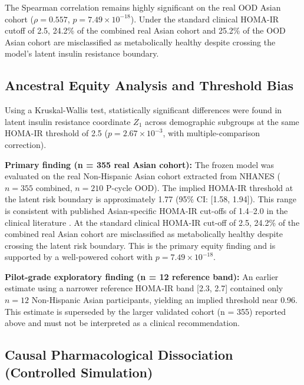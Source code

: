 \documentclass[12pt,a4paper,oneside]{report}
\begin{document}
The Spearman correlation remains highly significant on the real OOD Asian cohort ($\rho = 0.557$, $p = 7.49 \times 10^{-18}$). Under the standard clinical HOMA-IR cutoff of 2.5, 24.2\% of the combined real Asian cohort and 25.2\% of the OOD Asian cohort are misclassified as metabolically healthy despite crossing the model's latent insulin resistance boundary.

\subsection{Ancestral Equity Analysis and Threshold Bias}

Using a Kruskal-Wallis test, statistically significant differences were found in latent insulin resistance coordinate $Z_1$ across demographic subgroups at the same HOMA-IR threshold of 2.5 ($p = 2.67 \times 10^{-3}$, with multiple-comparison correction).

\textbf{Primary finding (n = 355 real Asian cohort):} The frozen model was evaluated on the real Non-Hispanic Asian cohort extracted from NHANES ($n = 355$ combined, $n = 210$ P-cycle OOD). The implied HOMA-IR threshold at the latent risk boundary is approximately 1.77 (95\% CI: [1.58, 1.94]). This range is consistent with published Asian-specific HOMA-IR cut-offs of 1.4--2.0 in the clinical literature \citep{cdc2020}. At the standard clinical HOMA-IR cut-off of 2.5, 24.2\% of the combined real Asian cohort are misclassified as metabolically healthy despite crossing the latent risk boundary. This is the primary equity finding and is supported by a well-powered cohort with $p = 7.49 \times 10^{-18}$.

\textbf{Pilot-grade exploratory finding (n = 12 reference band):} An earlier estimate using a narrower reference HOMA-IR band [2.3, 2.7] contained only $n = 12$ Non-Hispanic Asian participants, yielding an implied threshold near 0.96. This estimate is superseded by the larger validated cohort (n = 355) reported above and must not be interpreted as a clinical recommendation.

\subsection{Causal Pharmacological Dissociation (Controlled Simulation)}
\end{document}
